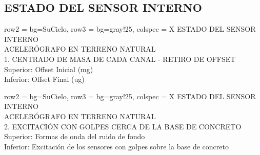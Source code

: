 \subsection{ESTADO DEL SENSOR INTERNO}
\begin{table}[H]
    \begin{tblr}{
        row{2} = {bg=SuCielo},
        row{3} = {bg=gray!25},
        colspec = {X}
    }
        ESTADO DEL SENSOR INTERNO \\
        ACELERÓGRAFO EN TERRENO NATURAL \\
        1. CENTRADO DE MASA DE CADA CANAL - RETIRO DE OFFSET \\
        {Superior: Offset Inicial (mg) \\ Inferior: Offset Final (ug)}
    \end{tblr}
\end{table}
\begin{table}[H]
    \begin{tblr}{
        row{2} = {bg=SuCielo},
        row{3} = {bg=gray!25},
        colspec = {X}
    }
        ESTADO DEL SENSOR INTERNO \\
        ACELERÓGRAFO EN TERRENO NATURAL \\
        2. EXCITACIÓN CON GOLPES CERCA DE LA BASE DE CONCRETO \\
        {Superior: Formas de onda del ruido de fondo \\ Inferior: Excitación de los sensores con golpes sobre la base de concreto}
    \end{tblr}
\end{table}
